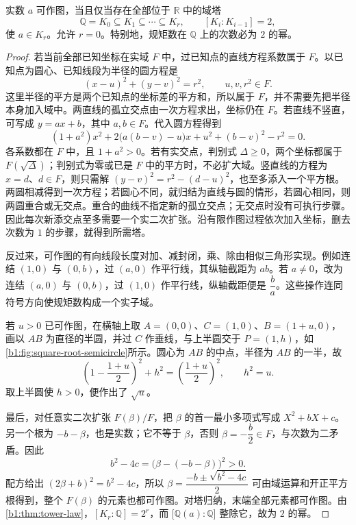 \begin{theorem}\label{b1:thm:constructible-quadratic-tower}
	实数 \(a\) 可作图，当且仅当存在全部位于 \(\mathbb R\) 中的域塔
	\[
		\mathbb Q=K_0\subseteq K_1\subseteq\cdots\subseteq K_r, \qquad [K_i:K_{i-1}]=2,
	\]
	使 \(a\in K_r\)。允许 \(r=0\)。特别地，规矩数在 \(\mathbb Q\) 上的次数必为 \(2\) 的幂。
\end{theorem}
\begin{proof}
	若当前全部已知坐标在实域 \(F\) 中，过已知点的直线方程系数属于 \(F\)。以已知点为圆心、已知线段为半径的圆方程是
	\[
		(x-u)^2+(y-v)^2=r^2, \qquad u,v,r^2\in F.
	\]
	这里半径的平方是两个已知点的坐标差的平方和，所以属于 \(F\)，并不需要先把半径本身加入域中。两直线的孤立交点由一次方程求出，坐标仍在 \(F\)。若直线不竖直，可写成 \(y=ax+b\)，其中 \(a,b\in F\)。代入圆方程得到
	\[
		(1+a^2)x^2+2\bigl(a(b-v)-u\bigr)x +u^2+(b-v)^2-r^2=0.
	\]
	各系数都在 \(F\) 中，且 \(1+a^2>0\)。若有实交点，判别式 \(\Delta\ge0\)，两个坐标都属于 \(F(\sqrt\Delta)\)；判别式为零或已是 \(F\) 中的平方时，不必扩大域。竖直线的方程为 \(x=d\)、\(d\in F\)，则只需解 \((y-v)^2=r^2-(d-u)^2\)，也至多添入一个平方根。两圆相减得到一次方程；若圆心不同，就归结为直线与圆的情形，若圆心相同，则两圆重合或无交点。重合的曲线不指定新的孤立交点；无交点时没有可执行步骤。因此每次新添交点至多需要一个实二次扩张。沿有限作图过程依次加入坐标，删去次数为 \(1\) 的步骤，就得到所需塔。

	反过来，可作图的有向线段长度对加、减封闭，乘、除由相似三角形实现。例如连结 \((1,0)\) 与 \((0,b)\)，过 \((a,0)\) 作平行线，其纵轴截距为 \(ab\)。若 \(a\neq0\)，改为连结 \((a,0)\) 与 \((0,b)\)，过 \((1,0)\) 作平行线，纵轴截距便是 \(\dfrac ba\)。这些操作连同符号方向使规矩数构成一个实子域。

	若 \(u>0\) 已可作图，在横轴上取 \(A=(0,0)\)、\(C=(1,0)\)、\(B=(1+u,0)\)，画以 \(AB\) 为直径的半圆，并过 \(C\) 作垂线，与上半圆交于 \(P=(1,h)\)，如\cref{b1:fig:square-root-semicircle}所示。圆心为 \(AB\) 的中点，半径为 \(AB\) 的一半，故
	\[
		\left(1-\frac{1+u}{2}\right)^2+h^2 =\left(\frac{1+u}{2}\right)^2, \qquad h^2=u.
	\]
	取上半圆使 \(h>0\)，便作出了 \(\sqrt u\)。

	

	最后，对任意实二次扩张 \(F(\beta)/F\)，把 \(\beta\) 的首一最小多项式写成 \(X^2+bX+c\)。另一个根为 \(-b-\beta\)，也是实数；它不等于 \(\beta\)，否则 \(\beta=-\dfrac b2\in F\)，与次数为二矛盾。因此
	\[
		b^2-4c=\bigl(\beta-(-b-\beta)\bigr)^2>0.
	\]
	配方给出 \((2\beta+b)^2=b^2-4c\)，所以 \(\beta=\dfrac{-b\pm\sqrt{b^2-4c}}2\) 可由域运算和开正平方根得到，整个 \(F(\beta)\) 的元素也都可作图。对塔归纳，末端全部元素都可作图。由\cref{b1:thm:tower-law}，\([K_r:\mathbb Q]=2^r\)，而 \(\bigl[\mathbb Q(a):\mathbb Q\bigr]\) 整除它，故为 \(2\) 的幂。
\end{proof}

